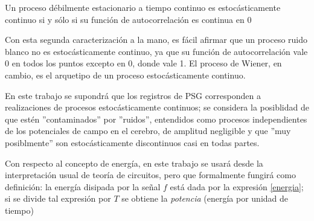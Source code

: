 \begin{thrm}
Un proceso d\'ebilmente estacionario a tiempo continuo es estoc\'asticamente continuo si y s\'olo si
su funci\'on de autocorrelaci\'on es continua en 0
\end{thrm}

Con esta segunda caracterizaci\'on a la mano, es f\'acil afirmar que un proceso %
ruido blanco
no es estoc\'asticamente continuo,
ya que su funci\'on de autocorrelaci\'on vale 0 en todos los puntos
excepto en 0, donde vale 1. 
El proceso de Wiener, en cambio, es el arquetipo de un proceso estoc\'asticamente continuo.

En este trabajo se supondr\'a que los registros de PSG corresponden a realizaciones
de procesos estoc\'asticamente continuos; se considera la posiblidad de que est\'en
''contaminados'' por ''ruidos'', entendidos como procesos independientes de los potenciales de 
campo 
en el cerebro, de amplitud negligible y que ''muy posiblmente'' son estoc\'asticamente discontinuos 
casi en todas partes.


Con respecto al concepto de energ\'ia, en este trabajo se usar\'a 
desde la interpretaci\'on usual de teor\'ia de circuitos, pero que formalmente fungir\'a 
como definici\'on:
la energ\'ia disipada por la se\~nal $f$ 
est\'a dada por la expresi\'on \ref{energia}; si se divide tal expresi\'on
por $T$ se obtiene la \textit{potencia} (energ\'ia por unidad de tiempo)

